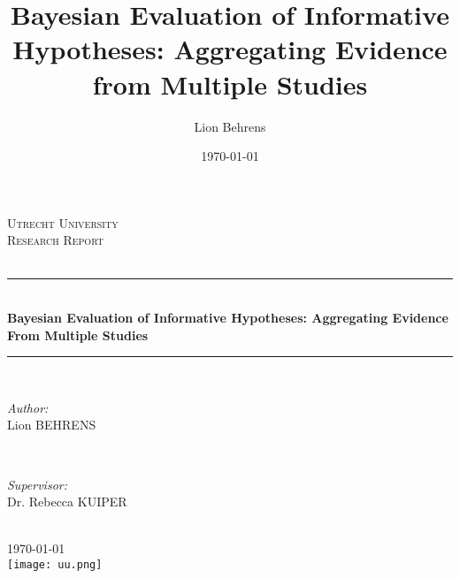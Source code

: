 \documentclass[11pt, a4paper]{article} %
\title{Bayesian Evaluation of Informative Hypotheses: Aggregating Evidence from Multiple Studies}
\author{Lion Behrens}
\date{\today}
\begin{document}
\begin{titlepage}
	
	\newcommand{\HRule}{\rule{\linewidth}{0.5mm}} 
	
	\centering 
	
	
	\textsc{\LARGE Utrecht University}\\[1.5cm] 
	\textsc{\Large Research Report}\\[0.5cm] 
	\textsc{\large }\\[0.5cm] 
	
	
	\HRule \\[0.4cm]
	{ \huge \bfseries Bayesian Evaluation of Informative Hypotheses: Aggregating Evidence From Multiple Studies}\\[0.4cm] 
	\HRule \\[1.5cm]
	
	
	\begin{minipage}{0.4\textwidth}
		\begin{flushleft} \large
			\emph{Author:}\\
			Lion \textsc{BEHRENS} 
		\end{flushleft}
	\end{minipage}
	~
	\begin{minipage}{0.4\textwidth}
		\begin{flushright} \large
			\emph{Supervisor:} \\
			Dr. Rebecca \textsc{KUIPER} 
		\end{flushright}
	\end{minipage}\\[2cm]
	
	
	
	{\large \today}\\[2cm] 
	
	
	\texttt{[image: uu.png]}\\[1cm] 
	
	
	\vfill
	
\end{titlepage}
\end{document}

